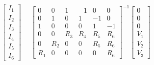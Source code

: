 \documentclass{article}
\begin{document}
\thispagestyle{empty}

$$
\begin{bmatrix}
I_1\\ I_2\\ I_3\\ I_4\\ I_5\\ I_6
\end{bmatrix}
=
\begin{bmatrix}
0 & 0 & 1 & -1 & 0 & 0 \\
0 & 1 & 0 & 1 & -1 & 0 \\
1 & 0 & 0 & 0 & 1 & -1 \\
0 & 0 & R_{3} & R_{4} & R_{5} & R_{6} \\
0 & R_{2} & 0 & 0 & R_{5} & R_{6} \\
R_{1} & 0 & 0 & 0 & 0 & R_{6}
\end{bmatrix}^{-1}
\begin{bmatrix}
0\\ 0\\ 0\\ V_1\\ V_2\\ V_3
\end{bmatrix}
$$
\end{document}
